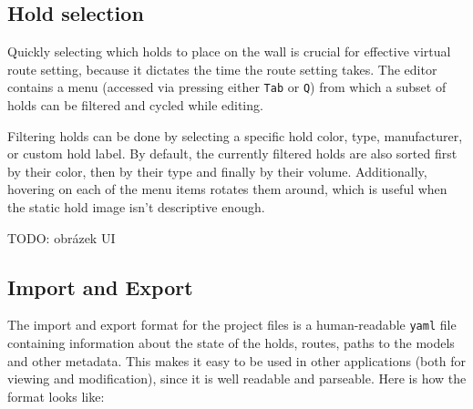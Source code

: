 \subsection{Hold selection}
Quickly selecting which holds to place on the wall is crucial for effective virtual route setting, because it dictates the time the route setting takes.
The editor contains a menu (accessed via pressing either \verb|Tab| or \verb|Q|) from which a subset of holds can be filtered and cycled while editing.

Filtering holds can be done by selecting a specific hold color, type, manufacturer, or custom hold label.
By default, the currently filtered holds are also sorted first by their color, then by their type and finally by their volume.
Additionally, hovering on each of the menu items rotates them around, which is useful when the static hold image isn't descriptive enough.

TODO: obrázek UI


\subsection{Import and Export}
The import and export format for the project files is a human-readable \verb|yaml| file containing information about the state of the holds, routes, paths to the models and other metadata.
This makes it easy to be used in other applications (both for viewing and modification), since it is well readable and parseable.
Here is how the format looks like:

